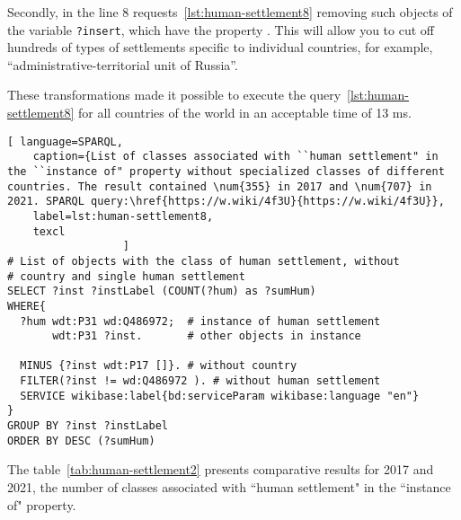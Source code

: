 Secondly, in the line \num{8} requests~\ref{lst:human-settlement8}
removing such objects of the variable \lstinline|?insert|, 
which have the property . 
This will allow you to cut off hundreds of types of settlements specific to individual countries, 
for example, ``administrative-territorial unit of Russia''.

These transformations made it possible to execute the query~\ref{lst:human-settlement8}
for all countries of the world in an acceptable time of 13 ms.

\begin{lstlisting}[ language=SPARQL, 
    caption={List of classes associated with ``human settlement" in the ``instance of" property without specialized classes of different countries. The result contained \num{355} in 2017 and \num{707} in 2021. SPARQL query:\href{https://w.wiki/4f3U}{https://w.wiki/4f3U}}, 
    label=lst:human-settlement8,
    texcl 
                  ]
# List of objects with the class of human settlement, without 
# country and single human settlement
SELECT ?inst ?instLabel (COUNT(?hum) as ?sumHum) 
WHERE{ 
  ?hum wdt:P31 wd:Q486972;  # instance of human settlement
       wdt:P31 ?inst.       # other objects in instance
  
  MINUS {?inst wdt:P17 []}. # without country
  FILTER(?inst != wd:Q486972 ). # without human settlement
  SERVICE wikibase:label{bd:serviceParam wikibase:language "en"}
}  
GROUP BY ?inst ?instLabel
ORDER BY DESC (?sumHum)
\end{lstlisting}%

The table~\ref{tab:human-settlement2} presents
comparative results for 2017 and 2021,
the number of classes associated with ``human settlement" in the ``instance of" property.

